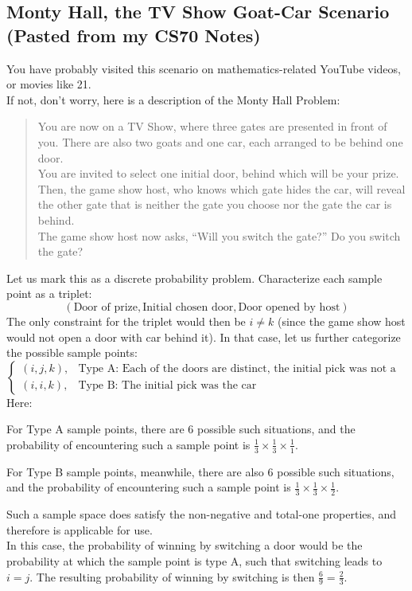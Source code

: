 \subsection{Monty Hall, the TV Show Goat-Car Scenario (Pasted from my CS70 Notes)}
You have probably visited this scenario on mathematics-related YouTube videos, or movies like 21. \\
If not, don't worry, here is a description of the Monty Hall Problem:
\begin{quote}
    You are now on a TV Show, where three gates are presented in front of you. There are also two goats and one car, each arranged to be behind one door. \\
    You are invited to select one initial door, behind which will be your prize. \\
    Then, the game show host, who knows which gate hides the car, will reveal the other gate that is neither the gate you choose nor the gate the car is behind. \\
    The game show host now asks, ``Will you switch the gate?'' Do you switch the gate?
\end{quote}
Let us mark this as a discrete probability problem. Characterize each sample point as a triplet:
\[(\text{Door of prize}, \text{Initial chosen door}, \text{Door opened by host})\]
The only constraint for the triplet would then be $i \neq k$ (since the game show host would not open a door with car behind it).
In that case, let us further categorize the possible sample points:
\[
    \begin{cases}
        (i, j, k), &\text{Type A: Each of the doors are distinct, the initial pick was not a car} \\
        (i, i, k), &\text{Type B: The initial pick was the car}
    \end{cases}
\]
Here:
\begin{bindenum}
    \item[] For Type A sample points, there are $6$ possible such situations, and the probability of encountering such a sample point is $\frac{1}{3} \times \frac{1}{3} \times \frac{1}{1}$.
    \item[] For Type B sample points, meanwhile, there are also $6$ possible such situations, and the probability of encountering such a sample point is $\frac{1}{3} \times \frac{1}{3} \times \frac{1}{2}$.
\end{bindenum}
Such a sample space does satisfy the non-negative and total-one properties, and therefore is applicable for use. \\
In this case, the probability of winning by switching a door would be the probability at which the sample point is type A, such that switching leads to $i = j$. The resulting probability of winning by switching is then $\frac{6}{9} = \frac{2}{3}$.


